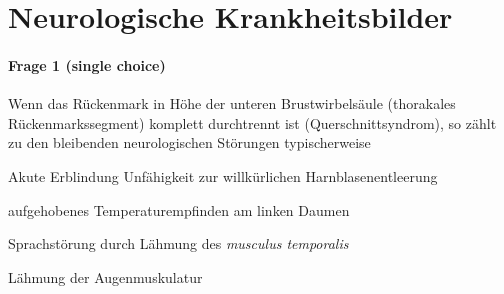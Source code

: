 \section*{Neurologische Krankheitsbilder}

\paragraph{Frage 1 (single choice)}

Wenn das Rückenmark in Höhe der unteren Brustwirbelsäule (thorakales Rückenmarkssegment) komplett durchtrennt ist (Querschnittsyndrom), so zählt zu den bleibenden neurologischen Störungen typischerweise

\begin{benumerate}
  \item Akute Erblindung
  \bolditem Unfähigkeit zur willkürlichen Harnblasenentleerung
  \item aufgehobenes Temperaturempfinden am linken Daumen
  \item Sprachstörung durch Lähmung des \emph{musculus temporalis}
  \item Lähmung der Augenmuskulatur
\end{benumerate}